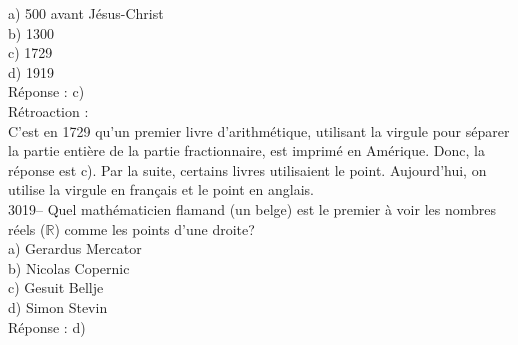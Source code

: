 \documentclass[letterpaper, 12pt]{article}
\begin{document}
a) 500 avant J\'esus-Christ\\
b) 1300\\
c) 1729\\
d) 1919\\

R\'eponse : c)\\

R\'etroaction :\\
C'est en 1729 qu'un premier livre d'arithm\'etique, utilisant la virgule pour s\'eparer la partie enti\`ere de la partie fractionnaire, est imprim\'e en Am\'erique. Donc, la r\'eponse est c). Par la suite, certains livres utilisaient le point. Aujourd'hui, on utilise la virgule en fran\c cais et le point en anglais.\\



3019-- Quel math\'ematicien flamand (un belge) est le premier \`a voir les nombres r\'eels ($\mathbb{R}$) comme les points d'une droite?\\

a) Gerardus Mercator\\
b) Nicolas Copernic\\
c) Gesuit Bellje\\
d) Simon Stevin\\

R\'eponse : d)\\
\end{document}
